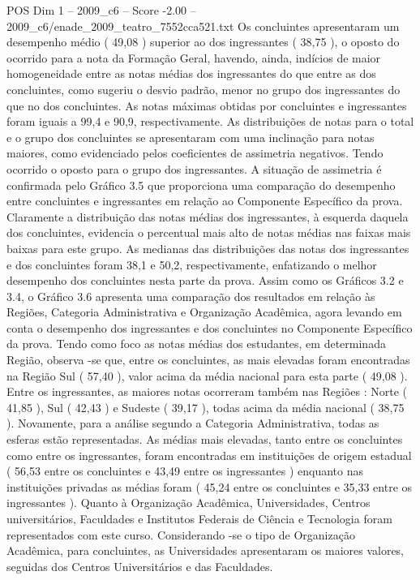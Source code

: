 \begin{textsample}{POS Dim 1 – 2009\_c6 – Score -2.00 – 2009\_c6/enade\_2009\_teatro\_7552cca521.txt}
Os concluintes apresentaram um desempenho médio ( 49,08 ) superior ao dos ingressantes ( 38,75 ), o oposto do ocorrido para a nota da Formação Geral, havendo, ainda, indícios de maior homogeneidade entre as notas médias dos ingressantes do que entre as dos concluintes, como sugeriu o desvio padrão, menor no grupo dos ingressantes do que no dos concluintes.
As notas máximas obtidas por concluintes e ingressantes foram iguais a 99,4 e 90,9, respectivamente.
As distribuições de notas para o total e o grupo dos concluintes se apresentaram com uma inclinação para notas maiores, como evidenciado pelos coeficientes de assimetria negativos.
Tendo ocorrido o oposto para o grupo dos ingressantes.
A situação de assimetria é confirmada pelo Gráfico 3.5 que proporciona uma comparação do desempenho entre concluintes e ingressantes em relação ao Componente Específico da prova.
Claramente a distribuição das notas médias dos ingressantes, à esquerda daquela dos concluintes, evidencia o percentual mais alto de notas médias nas faixas mais baixas para este grupo.
As medianas das distribuições das notas dos ingressantes e dos concluintes foram 38,1 e 50,2, respectivamente, enfatizando o melhor desempenho dos concluintes nesta parte da prova.
Assim como os Gráficos 3.2 e 3.4, o Gráfico 3.6 apresenta uma comparação dos resultados em relação às Regiões, Categoria Administrativa e Organização Acadêmica, agora levando em conta o desempenho dos ingressantes e dos concluintes no Componente Específico da prova.
Tendo como foco as notas médias dos estudantes, em determinada Região, observa -se que, entre os concluintes, as mais elevadas foram encontradas na Região Sul ( 57,40 ), valor acima da média nacional para esta parte ( 49,08 ).
Entre os ingressantes, as maiores notas ocorreram também nas Regiões : Norte ( 41,85 ), Sul ( 42,43 ) e Sudeste ( 39,17 ), todas acima da média nacional ( 38,75 ).
Novamente, para a análise segundo a Categoria Administrativa, todas as esferas estão representadas.
As médias mais elevadas, tanto entre os concluintes como entre os ingressantes, foram encontradas em instituições de origem estadual ( 56,53 entre os concluintes e 43,49 entre os ingressantes ) enquanto nas instituições privadas as médias foram ( 45,24 entre os concluintes e 35,33 entre os ingressantes ).
Quanto à Organização Acadêmica, Universidades, Centros universitários, Faculdades e Institutos Federais de Ciência e Tecnologia foram representados com este curso.
Considerando -se o tipo de Organização Acadêmica, para concluintes, as Universidades apresentaram os maiores valores, seguidas dos Centros Universitários e das Faculdades.

\end{textsample}
